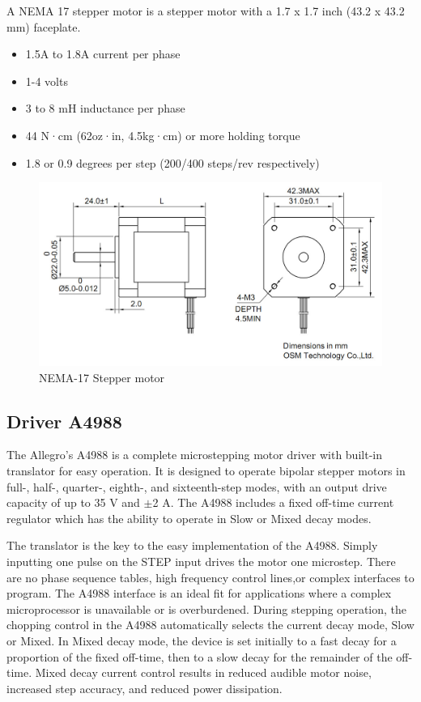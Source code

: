 A NEMA 17 stepper motor is a stepper motor with a 1.7 x 1.7 inch (43.2 x 43.2 mm) faceplate\cite{reprap_nema17_thesis}.
\begin{itemize}
\item 1.5A to 1.8A current per phase
\item 1-4 volts
\item 3 to 8 mH inductance per phase
\item 44 N·cm (62oz·in, 4.5kg·cm) or more holding torque
\item 1.8 or 0.9 degrees per step (200/400 steps/rev respectively)
\end{itemize}
\begin{figure}[H]
	\centering
	\includegraphics[width=\maxwidth{15cm}, keepaspectratio]{Chapters/Fig/nema_17_stepper_motor.jpg}
	\caption{NEMA-17 Stepper motor}
	\label{fig:nema_17_stepper_motor}
\end{figure}

\subsection{Driver A4988}

The Allegro's A4988 is a complete microstepping motor driver with built-in translator for easy operation. It is designed to operate bipolar stepper motors in full-, half-, quarter-, eighth-, and sixteenth-step modes, with an output drive capacity of up to 35 V and $\pm$2 A. The A4988 includes a fixed off-time current regulator which has the ability to operate in Slow or Mixed decay modes\cite{A4988_allegro_thesis}.

The translator is the key to the easy implementation of the A4988. Simply inputting one pulse on the STEP input drives the motor one microstep. There are no phase sequence tables, high frequency control lines,or complex interfaces to program. The A4988 interface is an ideal fit for applications where a complex microprocessor is unavailable or is overburdened. During stepping operation, the chopping control in the A4988 automatically selects the current decay mode, Slow or Mixed. In Mixed decay mode, the device is set initially to a fast decay for a proportion of the fixed off-time, then to a slow decay for the remainder of the off-time. Mixed decay current control results in reduced audible motor noise, increased step accuracy, and reduced power dissipation\cite{A4988_allegro_thesis}.

